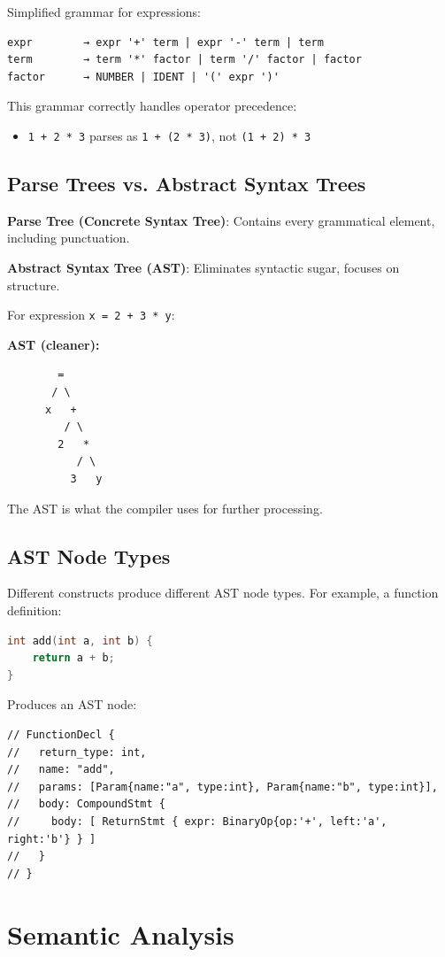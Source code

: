 Simplified grammar for expressions:
\begin{verbatim}
expr        → expr '+' term | expr '-' term | term
term        → term '*' factor | term '/' factor | factor
factor      → NUMBER | IDENT | '(' expr ')'
\end{verbatim}

This grammar correctly handles operator precedence:
\begin{itemize}
    \item \texttt{1 + 2 * 3} parses as \texttt{1 + (2 * 3)}, not \texttt{(1 + 2) * 3}
\end{itemize}

\subsection{Parse Trees vs. Abstract Syntax Trees}

\textbf{Parse Tree (Concrete Syntax Tree)}: Contains every grammatical element, including punctuation.

\textbf{Abstract Syntax Tree (AST)}: Eliminates syntactic sugar, focuses on structure.

For expression \texttt{x = 2 + 3 * y}:

\textbf{AST (cleaner):}
\begin{verbatim}
        =
       / \
      x   +
         / \
        2   *
           / \
          3   y
\end{verbatim}

The AST is what the compiler uses for further processing.

\subsection{AST Node Types}

Different constructs produce different AST node types. For example, a function definition:
\begin{lstlisting}[language=C]
int add(int a, int b) {
    return a + b;
}
\end{lstlisting}

Produces an AST node:
\begin{verbatim}
// FunctionDecl {
//   return_type: int,
//   name: "add",
//   params: [Param{name:"a", type:int}, Param{name:"b", type:int}],
//   body: CompoundStmt {
//     body: [ ReturnStmt { expr: BinaryOp{op:'+', left:'a', right:'b'} } ]
//   }
// }
\end{verbatim}

\section{Semantic Analysis}


